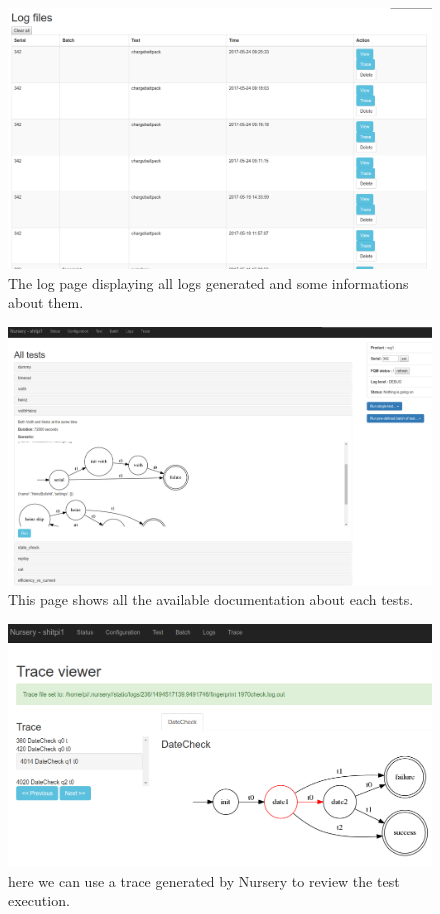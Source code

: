 \documentclass[12pt]{article}
\theoremstyle{definition}
\theoremstyle{definition}
\begin{document}
\begin{figure}
    \centering
    \includegraphics[scale=0.4]{wa_logs.png}
    \caption{The log page displaying all logs generated and some informations about them.}
    \label{wa_logs}
\end{figure}

\begin{figure}
    \centering
    \includegraphics[scale=0.2]{wa_tests_doc.png}
    \caption{This page shows all the available documentation about each tests.}
    \label{wa_tests_doc}
\end{figure}

\begin{figure}
    \centering
    \includegraphics[scale=0.4]{wa_trace.png}
    \caption{here we can use a trace generated by Nursery to review the test execution.}
    \label{wa_trace}
\end{figure}
\end{document}
